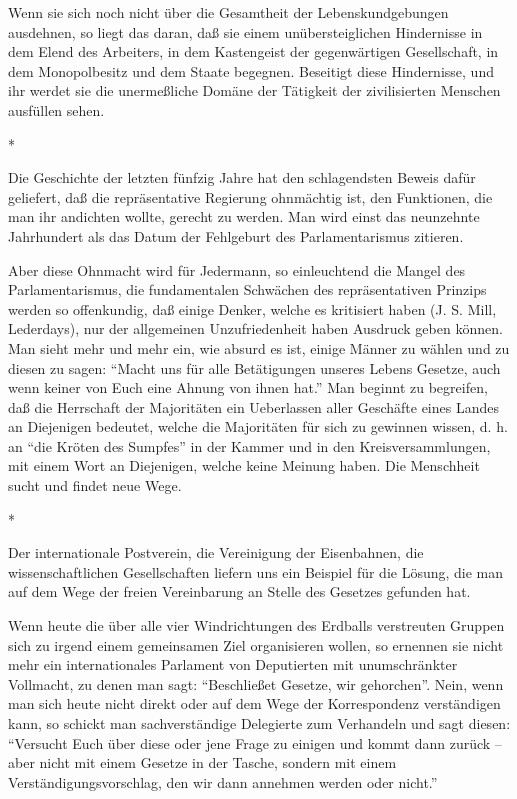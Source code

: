 \documentclass{scrbook}
\begin{document}
Wenn sie sich noch nicht über die Gesamtheit der Lebenskundgebungen ausdehnen, so liegt das daran, daß sie einem unübersteiglichen Hindernisse in dem Elend des Arbeiters, in dem Kastengeist der gegenwärtigen Gesellschaft, in dem Monopolbesitz und dem Staate begegnen. Beseitigt diese Hindernisse, und ihr werdet sie die unermeßliche Domäne der Tätigkeit der zivilisierten Menschen ausfüllen sehen.

\begin{center}*\end{center}

Die Geschichte der letzten fünfzig Jahre hat den schlagendsten Beweis dafür geliefert, daß die repräsentative Regierung ohnmächtig ist, den Funktionen, die man ihr andichten wollte, gerecht zu werden. Man wird einst das neunzehnte Jahrhundert als das Datum der Fehlgeburt des Parlamentarismus zitieren.

Aber diese Ohnmacht wird für Jedermann, so einleuchtend die Mangel des Parlamentarismus, die fundamentalen Schwächen des repräsentativen Prinzips werden so offenkundig, daß einige Denker, welche es kritisiert haben (J. S. Mill, Lederdays), nur der allgemeinen Unzufriedenheit haben Ausdruck geben können. Man sieht mehr und mehr ein, wie absurd es ist, einige Männer zu wählen und zu diesen zu sagen: ``Macht uns für alle Betätigungen unseres Lebens Gesetze, auch wenn keiner von Euch eine Ahnung von ihnen hat.'' Man beginnt zu begreifen, daß die Herrschaft der Majoritäten ein Ueberlassen aller Geschäfte eines Landes an Diejenigen bedeutet, welche die Majoritäten für sich zu gewinnen wissen, d. h. an ``die Kröten des Sumpfes'' in der Kammer und in den Kreisversammlungen, mit einem Wort an Diejenigen, welche keine Meinung haben. Die Menschheit sucht und findet neue Wege.

\begin{center}*\end{center}

Der internationale Postverein, die Vereinigung der Eisenbahnen, die wissenschaftlichen Gesellschaften liefern uns ein Beispiel für die Lösung, die man auf dem Wege der freien Vereinbarung an Stelle des Gesetzes gefunden hat.

Wenn heute die über alle vier Windrichtungen des Erdballs verstreuten Gruppen sich zu irgend einem gemeinsamen Ziel organisieren wollen, so ernennen sie nicht mehr ein internationales Parlament von Deputierten mit unumschränkter Vollmacht, zu denen man sagt: ``Beschließet Gesetze, wir gehorchen''. Nein, wenn man sich heute nicht direkt oder auf dem Wege der Korrespondenz verständigen kann, so schickt man sachverständige Delegierte zum Verhandeln und sagt diesen: ``Versucht Euch über diese oder jene Frage zu einigen und kommt dann zurück – aber nicht mit einem Gesetze in der Tasche, sondern mit einem Verständigungsvorschlag, den wir dann annehmen werden oder nicht.''
\end{document}
